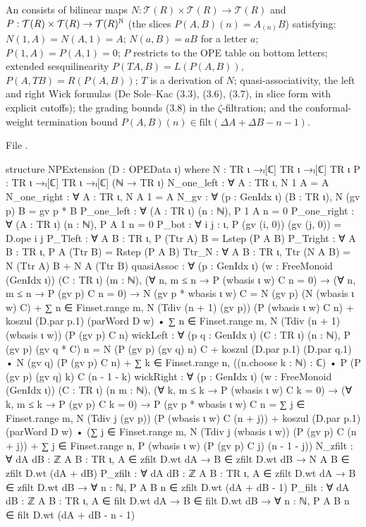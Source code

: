 \begin{definition}\label{l11:def:npext}
An  consists of bilinear maps $N:\mathcal T(R)\times\mathcal T(R)\to\mathcal T(R)$ and
$P:\mathcal T(R)\times\mathcal T(R)\to\mathcal T(R)^{{\mathbb{N}}}$ (the slices $P(A,B)(n) = A_{(n)}B$) satisfying: $N(1,A) = N(A,1) = A$;
$N(a,B) = aB$ for a letter $a$; $P(1,A) = P(A,1) = 0$; $P$ restricts to the OPE table on bottom letters; extended
sesquilinearity $P(TA,B) = L(P(A,B))$, $P(A,TB) = R(P(A,B))$; $T$ is a derivation of $N$; quasi-associativity, the left and
right Wick formulas (De Sole--Kac (3.3), (3.6), (3.7), in slice form with explicit cutoffs); the grading bounds (3.8) in the
$\zeta$-filtration; and the conformal-weight termination bound $P(A,B)(n)\in\mathrm{filt}(\Delta A+\Delta B-n-1)$.
\end{definition}
\noindent File .
\begin{leancode}
structure NPExtension (D : OPEData ι) where
  N : TR ι →ₗ[ℂ] TR ι →ₗ[ℂ] TR ι
  P : TR ι →ₗ[ℂ] TR ι →ₗ[ℂ] (ℕ → TR ι)
  N_one_left : ∀ A : TR ι, N 1 A = A
  N_one_right : ∀ A : TR ι, N A 1 = A
  N_gv : ∀ (p : GenIdx ι) (B : TR ι), N (gv p) B = gv p * B
  P_one_left : ∀ (A : TR ι) (n : ℕ), P 1 A n = 0
  P_one_right : ∀ (A : TR ι) (n : ℕ), P A 1 n = 0
  P_bot : ∀ i j : ι, P (gv (i, 0)) (gv (j, 0)) = D.ope i j
  P_Tleft : ∀ A B : TR ι, P (Ttr A) B = Lstep (P A B)
  P_Tright : ∀ A B : TR ι, P A (Ttr B) = Rstep (P A B)
  Ttr_N : ∀ A B : TR ι, Ttr (N A B) = N (Ttr A) B + N A (Ttr B)
  quasiAssoc : ∀ (p : GenIdx ι) (w : FreeMonoid (GenIdx ι)) (C : TR ι) (m : ℕ),
    (∀ n, m ≤ n → P (wbasis ι w) C n = 0) →
    (∀ n, m ≤ n → P (gv p) C n = 0) →
    N (gv p * wbasis ι w) C
      = N (gv p) (N (wbasis ι w) C)
        + ∑ n ∈ Finset.range m, N (Tdiv (n + 1) (gv p)) (P (wbasis ι w) C n)
        + koszul (D.par p.1) (parWord D w) •
            ∑ n ∈ Finset.range m, N (Tdiv (n + 1) (wbasis ι w)) (P (gv p) C n)
  wickLeft : ∀ (p q : GenIdx ι) (C : TR ι) (n : ℕ),
    P (gv p) (gv q * C) n
      = N (P (gv p) (gv q) n) C
        + koszul (D.par p.1) (D.par q.1) • N (gv q) (P (gv p) C n)
        + ∑ k ∈ Finset.range n,
            ((n.choose k : ℕ) : ℂ) • P (P (gv p) (gv q) k) C (n - 1 - k)
  wickRight : ∀ (p : GenIdx ι) (w : FreeMonoid (GenIdx ι)) (C : TR ι) (n m : ℕ),
    (∀ k, m ≤ k → P (wbasis ι w) C k = 0) →
    (∀ k, m ≤ k → P (gv p) C k = 0) →
    P (gv p * wbasis ι w) C n
      = ∑ j ∈ Finset.range m, N (Tdiv j (gv p)) (P (wbasis ι w) C (n + j))
        + koszul (D.par p.1) (parWord D w) •
            (∑ j ∈ Finset.range m, N (Tdiv j (wbasis ι w)) (P (gv p) C (n + j))
              + ∑ j ∈ Finset.range n, P (wbasis ι w) (P (gv p) C j) (n - 1 - j))
  N_zfilt : ∀ {dA dB : ℤ} {A B : TR ι}, A ∈ zfilt D.wt dA → B ∈ zfilt D.wt dB →
    N A B ∈ zfilt D.wt (dA + dB)
  P_zfilt : ∀ {dA dB : ℤ} {A B : TR ι}, A ∈ zfilt D.wt dA → B ∈ zfilt D.wt dB →
    ∀ n : ℕ, P A B n ∈ zfilt D.wt (dA + dB - 1)
  P_filt : ∀ {dA dB : ℤ} {A B : TR ι}, A ∈ filt D.wt dA → B ∈ filt D.wt dB →
    ∀ n : ℕ, P A B n ∈ filt D.wt (dA + dB - n - 1)
\end{leancode}

